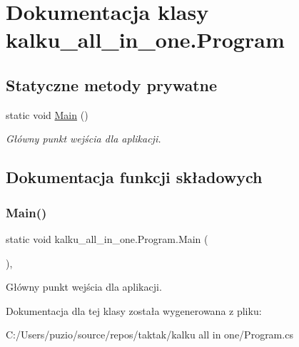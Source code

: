 \hypertarget{classkalku__all__in__one_1_1_program}{}\section{Dokumentacja klasy kalku\+\_\+all\+\_\+in\+\_\+one.\+Program}
\label{classkalku__all__in__one_1_1_program}
\subsection*{Statyczne metody prywatne}
\begin{DoxyCompactItemize}
\item 
static void \mbox{\hyperlink{classkalku__all__in__one_1_1_program_a449585331fe3e2f477555a8d140d0cf2}{Main}} ()
\begin{DoxyCompactList}\small\item\em Główny punkt wejścia dla aplikacji. \end{DoxyCompactList}\end{DoxyCompactItemize}


\subsection{Dokumentacja funkcji składowych}
\mbox{\label{classkalku__all__in__one_1_1_program_a449585331fe3e2f477555a8d140d0cf2}} 
\subsubsection{\texorpdfstring{Main()}{Main()}}
{\footnotesize\ttfamily static void kalku\+\_\+all\+\_\+in\+\_\+one.\+Program.\+Main (\begin{DoxyParamCaption}{ }\end{DoxyParamCaption})\hspace{0.3cm}{\ttfamily [static]}, {\ttfamily [private]}}



Główny punkt wejścia dla aplikacji. 



Dokumentacja dla tej klasy została wygenerowana z pliku\+:\begin{DoxyCompactItemize}
\item 
C\+:/\+Users/puzio/source/repos/taktak/kalku all in one/Program.\+cs\end{DoxyCompactItemize}
